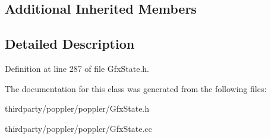 \subsection*{Additional Inherited Members}


\subsection{Detailed Description}


Definition at line 287 of file Gfx\+State.\+h.



The documentation for this class was generated from the following files\+:\begin{DoxyCompactItemize}
\item 
thirdparty/poppler/poppler/Gfx\+State.\+h\item 
thirdparty/poppler/poppler/Gfx\+State.\+cc\end{DoxyCompactItemize}
